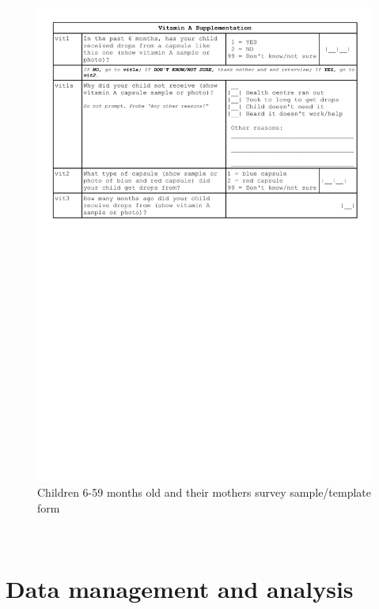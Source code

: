 \documentclass[12pt,a4paper]{book}
\theoremstyle{definition}
\theoremstyle{definition}
\theoremstyle{definition}
\theoremstyle{remark}
\begin{document}
\begin{figure}[H]
{\centering \includegraphics[width=29.15in]{forms/childForm4} 

}

\caption{Children 6-59 months old and their mothers survey sample/template form}\label{fig:childform}
\end{figure}

~

\hypertarget{data}{%
\chapter{Data management and analysis}\label{data}}


\end{document}
